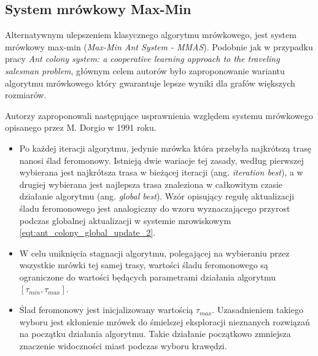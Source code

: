 {{        %
        \subsection{System mrówkowy Max-Min}
        {
            Alternatywnym ulepszeniem klasycznego algorytmu mrówkowego, jest system mrówkowy max-min (\textit{Max-Min
            Ant System - MMAS})\cite{Sttzle2000MAXMINAS}. Podobnie jak w przypadku pracy \textit{Ant colony system: a
            cooperative learning approach to the traveling salesman problem}\cite{Dorigo1997AntCS}, głównym celem
            autorów było zaproponowanie wariantu algorytmu mrówkowego który gwarantuje lepsze wyniki dla grafów
            większych rozmiarów.

            Autorzy zaproponowali następujące usprawnienia względem systemu mrówkowego opisanego przez M. Dorgio w 1991
            roku.

            \begin{itemize}
                \item Po każdej iteracji algorytmu, jedynie mrówka która przebyła najkrótszą trasę nanosi ślad
                feromonowy. Istnieją dwie wariacje tej zasady, według pierwszej wybierana jest najkrótsza trasa w
                bieżącej iteracji (ang. \textit{iteration best}), a w drugiej wybierana jest najlepsza trasa znaleziona
                w całkowitym czasie działanie algorytmu (ang. \textit{global best}). Wzór opisujący regułę aktualizacji
                śladu feromonowego jest analogiczny do wzoru wyznaczającego przyrost podczas globalnej aktualizacji w
                systemie mrowiskowym \ref{eqt:ant_colony_global_update_2}.

                \item W celu uniknięcia stagnacji algorytmu, polegającej na wybieraniu przez wszystkie mrówki tej samej
                trasy, wartości śladu feromonowego są ograniczone do wartości będących parametrami działania algorytmu
                $[\tau_{min}, \tau_{max}]$.

                \item Ślad feromonowy jest inicjalizowany wartością $\tau_{max}$. Uzasadnieniem takiego wyboru jest
                skłonienie mrówek do śmielszej eksploracji nieznanych rozwiązań na początku działania algorytmu. Takie
                działanie początkowo zmniejsza znaczenie widoczności miast podczas wyboru krawędzi.
            \end{itemize}
        }
    }

}
